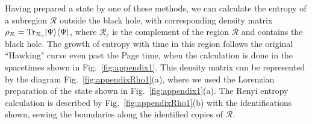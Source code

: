 \documentclass[11pt]{article}
\numberwithin{equation}{section}
\begin{document}
Having prepared a state by one of these methods, we can calculate the entropy of a subregion $\mathcal{R}$ outside the black hole, with corresponding  density matrix $\rho_{\mathcal{R}}= {\rm Tr}_{\mathcal{R}_c} |\Psi \rangle \langle \Psi |$, where $ \mathcal{R}_c$ is the complement of the region $\mathcal{R}$ and contains the black hole. The growth of entropy with time in this region follows the original ``Hawking" curve even past the Page time, when the calculation is done in the spacetimes shown in Fig.~\ref{fig:appendix1}. This density matrix can be represented by the diagram Fig.~\ref{fig:appendixRho1}(a), where we used the Lorenzian preparation of the state shown in Fig.~\ref{fig:appendix1}(a). The Renyi entropy calculation is described by Fig.~\ref{fig:appendixRho1}(b) with the identifications shown, sewing the boundaries along the identified copies of $\mathcal{R}$. 
\end{document}
